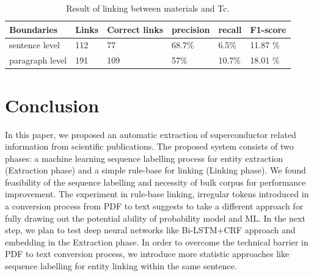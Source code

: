 \documentclass{article}[a4]
\begin{document}
\begin{table}[h!]
    \centering
    \begin{tabular}{ | m{7em} | m{4em}| m{4em}| m{4em}| m{4em} | m{4em} | } 
    \hline
        Boundaries & Links & Correct links & precision & recall & F1-score \\
    \hline
            sentence level  & 112 & 77 & 68.7\% & 6.5\% & 11.87 \% \\
    \hline
            paragraph level & 191 & 109 & 57\% & 10.7\% & 18.01 \% \\
    \hline
    \end{tabular}
    \label{table:result-linking}
    \caption{Result of linking between materials and Tc.}    
\end{table}


\section{Conclusion}
\label{sec:conclusion}
In this paper, we proposed an automatic extraction of superconductor related information from scientific publications. The proposed system consists of two phases: a machine learning sequence labelling process for entity extraction (Extraction phase) and a simple rule-base for linking (Linking phase). 
We found feasibility of the sequence labelling and necessity of bulk corpus for performance improvement. The experiment in rule-base linking, irregular tokens introduced in a conversion process from PDF to text suggests to take a different approach for fully drawing out the potential ability of probability model and ML.
In the next step, we plan to test deep neural networks like Bi-LSTM+CRF approach and embedding in the Extraction phase. In order to overcome the technical barrier in PDF to text conversion process, we introduce more statistic approaches like sequence labelling for entity linking within the same sentence.

\pagebreak



\end{document}
